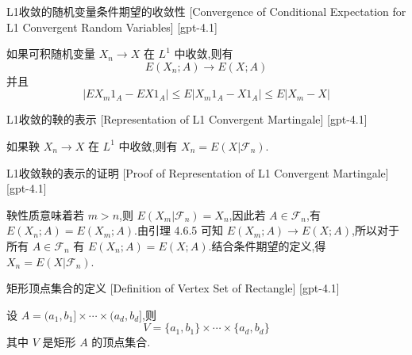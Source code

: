 \documentclass[UTF8]{ctexart}
\begin{document}
    
    
    \begin{lma}
        {L1收敛的随机变量条件期望的收敛性}
        [Convergence of Conditional Expectation for L1 Convergent Random Variables]
        [gpt-4.1]
        
如果可积随机变量 $X_n \to X$ 在 $L^1$ 中收敛,则有
\[
E ( X _ { n } ; A ) \to E ( X ; A )
\]
并且
\[
| E X _ { m } 1 _ { A } - E X 1 _ { A } | \leq E | X _ { m } 1 _ { A } - X 1 _ { A } | \leq E | X _ { m } - X |
\]

    \end{lma}
    
    
    
    \begin{lma}
        {L1收敛的鞅的表示}
        [Representation of L1 Convergent Martingale]
        [gpt-4.1]
        
如果鞅 $X_n \to X$ 在 $L^1$ 中收敛,则有 $X_n = E ( X | \mathcal{F}_n )$.

    \end{lma}
    
    
    
    \begin{prf}
        {L1收敛鞅的表示的证明}
        [Proof of Representation of L1 Convergent Martingale]
        [gpt-4.1]
        
鞅性质意味着若 $m > n$,则 $E ( X_m | \mathcal{F}_n ) = X_n$,因此若 $A \in \mathcal{F}_n$,有 $E ( X_n ; A ) = E ( X_m ; A )$.由引理 4.6.5 可知 $E ( X_m ; A ) \to E ( X ; A )$,所以对于所有 $A \in \mathcal{F}_n$ 有 $E ( X_n ; A ) = E ( X ; A )$.结合条件期望的定义,得 $X_n = E ( X | \mathcal{F}_n )$.

    \end{prf}
    
    
    
    \begin{dfn}
        {矩形顶点集合的定义}
        [Definition of Vertex Set of Rectangle]
        [gpt-4.1]
        
设 $A = (a_1, b_1] \times \cdots \times (a_d, b_d]$,则
\[
V = \{ a_1, b_1 \} \times \cdots \times \{ a_d, b_d \}
\]
其中 $V$ 是矩形 $A$ 的顶点集合.

    \end{dfn}
    
\end{document}
